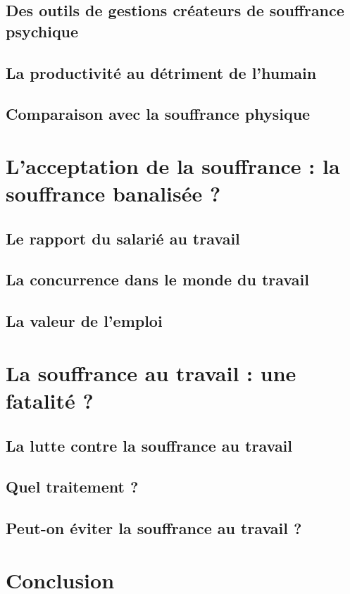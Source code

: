 \documentclass{report}
\begin{document}
	\section{Des outils de gestions créateurs de souffrance psychique}

	\section{La productivité au détriment de l'humain}

	\section{Comparaison avec la souffrance physique}

\chapter{L’acceptation de la souffrance : la souffrance banalisée ?}
	\section{Le rapport du salarié au travail}

	\section{La concurrence dans le monde du travail}

	\section{La valeur de l'emploi}

\chapter{La souffrance au travail : une fatalité ?}
	\section{La lutte contre la souffrance au travail}

	\section{Quel traitement ?}

	\section{Peut-on éviter la souffrance au travail ?}
    
\chapter*{Conclusion}
    \paragraph*{}
         
\end{document}
